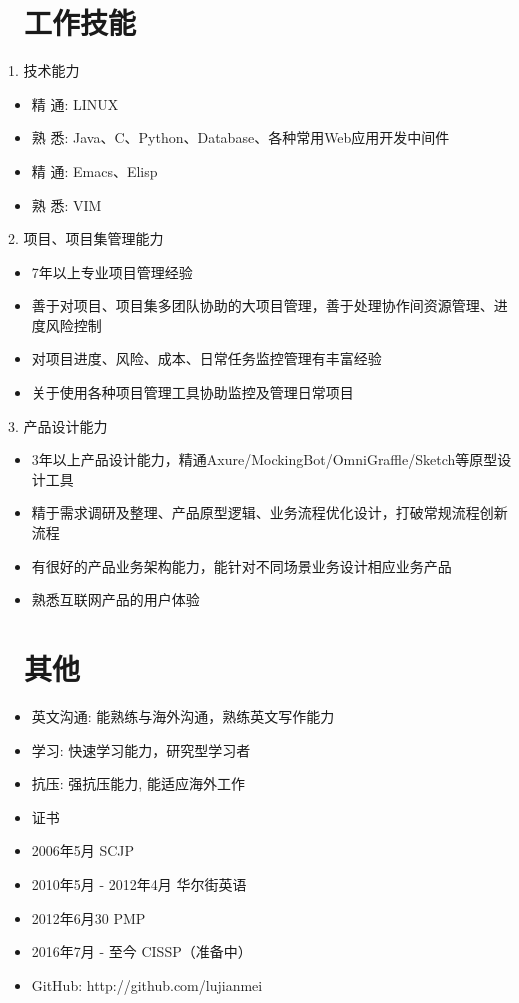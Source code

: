\documentclass{resume}
\begin{document}

\section{\faCogs\ 工作技能}
1. 技术能力
\begin{itemize}[parsep=0.5ex]
    \item  精 通: LINUX
    \item  熟 悉: Java、C、Python、Database、各种常用Web应用开发中间件
    \item  精 通:  Emacs、Elisp
    \item  熟 悉: VIM
  \end{itemize}
    
2. 项目、项目集管理能力
\begin{itemize}[parsep=0.5ex]
    \item 7年以上专业项目管理经验
    \item 善于对项目、项目集多团队协助的大项目管理，善于处理协作间资源管理、进度风险控制
    \item 对项目进度、风险、成本、日常任务监控管理有丰富经验
    \item 关于使用各种项目管理工具协助监控及管理日常项目
  \end{itemize}
3. 产品设计能力 
\begin{itemize}[parsep=0.5ex]
    \item 3年以上产品设计能力，精通Axure/MockingBot/OmniGraffle/Sketch等原型设计工具
    \item 精于需求调研及整理、产品原型逻辑、业务流程优化设计，打破常规流程创新流程
    \item 有很好的产品业务架构能力，能针对不同场景业务设计相应业务产品
    \item 熟悉互联网产品的用户体验
  \end{itemize}

    
\section{\faInfo\ 其他}
  \begin{itemize}[parsep=0.5ex]
    \item 英文沟通: 能熟练与海外沟通，熟练英文写作能力
    \item 学习: 快速学习能力，研究型学习者
    \item 抗压: 强抗压能力, 能适应海外工作
    \item 证书
      \item 2006年5月    SCJP
      \item 2010年5月 - 2012年4月 华尔街英语
      \item 2012年6月30  PMP
      \item 2016年7月 - 至今    CISSP（准备中）
    \item GitHub: http://github.com/lujianmei
    \end{itemize}

%
%
\end{document}
